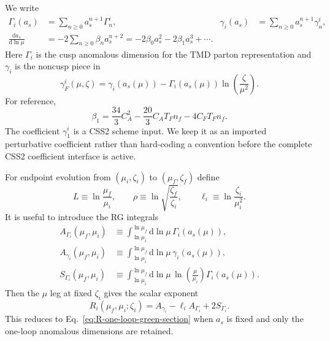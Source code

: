 \documentclass[11pt]{article}
\newcommand{\dd}{\mathrm{d}}
\begin{document}
We write
\begin{align}
  \Gamma_i(a_s)&=\sum_{n\ge0}a_s^{n+1}\Gamma_n^i,
  &
  \gamma_i(a_s)&=\sum_{n\ge0}a_s^{n+1}\gamma_n^i,
  \label{eq:anom-general-v11}
  \\
  \frac{\dd a_s}{\dd\ln\mu}
  &=-2\sum_{n\ge0}\beta_n a_s^{n+2}
  =-2\beta_0a_s^2-2\beta_1a_s^3+\cdots .
  \label{eq:beta-general-v11}
\end{align}
Here $\Gamma_i$ is the cusp anomalous dimension for the TMD parton representation and
$\gamma_i$ is the noncusp piece in
\begin{equation}
  \gamma_F^i(\mu,\zeta)
  =\gamma_i(a_s(\mu))
  -\Gamma_i(a_s(\mu))\ln\!\left(\frac{\zeta}{\mu^2}\right).
  \label{eq:gammaF-running-v11}
\end{equation}
For reference,
\begin{equation}
  \beta_1=\frac{34}{3}C_A^2-\frac{20}{3}C_AT_Fn_f-4C_FT_Fn_f .
  \label{eq:beta1-v11}
\end{equation}
The coefficient $\gamma_1^i$ is a CSS2 scheme input.  We keep it as an imported
perturbative coefficient rather than hard-coding a convention before the complete CSS2
coefficient interface is active.

For endpoint evolution from $(\mu_i,\zeta_i)$ to $(\mu_f,\zeta_f)$ define
\begin{equation}
  L\equiv\ln\frac{\mu_f}{\mu_i},
  \qquad
  \rho\equiv\ln\sqrt{\frac{\zeta_f}{\zeta_i}},
  \qquad
  \ell_i\equiv\ln\frac{\zeta_i}{\mu_i^2}.
  \label{eq:running-vars-v11}
\end{equation}
It is useful to introduce the RG integrals
\begin{align}
  A_{\Gamma_i}(\mu_f,\mu_i)
  &\equiv
  \int_{\ln\mu_i}^{\ln\mu_f}\!\dd\ln\mu\,\Gamma_i(a_s(\mu)),
  \label{eq:A-Gamma-v11}
  \\
  A_{\gamma_i}(\mu_f,\mu_i)
  &\equiv
  \int_{\ln\mu_i}^{\ln\mu_f}\!\dd\ln\mu\,\gamma_i(a_s(\mu)),
  \label{eq:A-gamma-v11}
  \\
  S_{\Gamma_i}(\mu_f,\mu_i)
  &\equiv
  \int_{\ln\mu_i}^{\ln\mu_f}\!\dd\ln\mu\,
  \ln\!\left(\frac{\mu}{\mu_i}\right)\Gamma_i(a_s(\mu)).
  \label{eq:S-Gamma-v11}
\end{align}
Then the $\mu$ leg at fixed $\zeta_i$ gives the scalar exponent
\begin{equation}
  \boxed{
  R_i(\mu_f,\mu_i;\zeta_i)
  =A_{\gamma_i}-\ell_iA_{\Gamma_i}+2S_{\Gamma_i}.}
  \label{eq:R-running-integral-v11}
\end{equation}
This reduces to Eq.~\eqref{eq:R-one-loop-green-section} when $a_s$ is fixed and only the
one-loop anomalous dimensions are retained.
\end{document}

